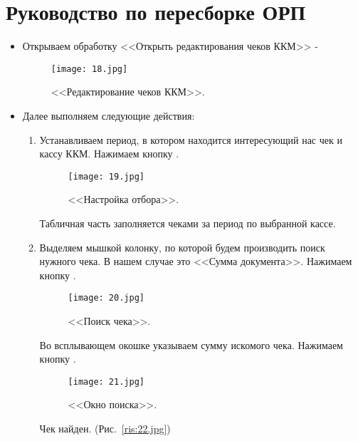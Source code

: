 \section{Руководство по пересборке ОРП}

\begin{itemize}	
	\item Открываем обработку <<Открыть редактирования чеков ККМ>>  - 
	
	
	\begin{figure}[H]
		\texttt{[image: 18.jpg]}
		\caption{<<Редактирование чеков ККМ>>.}
		\label{ris:18.jpg}
	\end{figure}

	\item Далее выполняем следующие действия:
	
	\begin{enumerate}[label={\alph*)},font={\color{red!50!black}\bfseries}] 
		
		\item Устанавливаем период, в котором находится интересующий нас чек и кассу ККМ. Нажимаем кнопку .
		
		\begin{figure}[H]
			\texttt{[image: 19.jpg]}
			\caption{<<Настройка отбора>>.}
			\label{ris:19.jpg}
		\end{figure}
		
		Табличная часть заполняется чеками за период по выбранной кассе.
		
		\item Выделяем мышкой колонку, по которой будем производить поиск нужного чека. В нашем случае это <<Сумма документа>>. Нажимаем кнопку .
		
		\begin{figure}[H]
			\texttt{[image: 20.jpg]}
			\caption{<<Поиск чека>>.}
			\label{ris:20.jpg}
		\end{figure}
	
		Во всплывающем окошке указываем сумму искомого чека. Нажимаем кнопку .	
		
		\begin{figure}[H]
			\texttt{[image: 21.jpg]}
			\caption{<<Окно поиска>>.}
			\label{ris:21.jpg}
		\end{figure}
		
		Чек найден. (Рис.~\ref{ris:22.jpg})
		

\end{enumerate}
\end{itemize}
